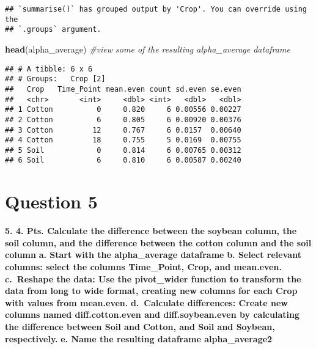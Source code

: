 \documentclass[
]{article}
\newenvironment{Shaded}{\begin{snugshade}}{\end{snugshade}}
\newcommand{\CommentTok}[1]{\textcolor[rgb]{0.56,0.35,0.01}{\textit{#1}}}
\newcommand{\FunctionTok}[1]{\textcolor[rgb]{0.13,0.29,0.53}{\textbf{#1}}}
\newcommand{\NormalTok}[1]{#1}
\begin{document}
\begin{verbatim}
## `summarise()` has grouped output by 'Crop'. You can override using the
## `.groups` argument.
\end{verbatim}

\begin{Shaded}
\begin{Highlighting}[]
\FunctionTok{head}\NormalTok{(alpha\_average) }\CommentTok{\#view some of the resulting alpha\_average dataframe}
\end{Highlighting}
\end{Shaded}

\begin{verbatim}
## # A tibble: 6 x 6
## # Groups:   Crop [2]
##   Crop   Time_Point mean.even count sd.even se.even
##   <chr>       <int>     <dbl> <int>   <dbl>   <dbl>
## 1 Cotton          0     0.820     6 0.00556 0.00227
## 2 Cotton          6     0.805     6 0.00920 0.00376
## 3 Cotton         12     0.767     6 0.0157  0.00640
## 4 Cotton         18     0.755     5 0.0169  0.00755
## 5 Soil            0     0.814     6 0.00765 0.00312
## 6 Soil            6     0.810     6 0.00587 0.00240
\end{verbatim}

\section{Question 5}\label{question-5}

\textbf{5. 4. Pts. Calculate the difference between the soybean column,
the soil column, and the difference between the cotton column and the
soil column} \textbf{a. Start with the alpha\_average dataframe}
\textbf{b. Select relevant columns: select the columns Time\_Point,
Crop, and mean.even.} \textbf{c.~Reshape the data: Use the pivot\_wider
function to transform the data from long to wide format, creating new
columns for each Crop with values from mean.even.} \textbf{d.~Calculate
differences: Create new columns named diff.cotton.even and
diff.soybean.even by calculating the difference between Soil and Cotton,
and Soil and Soybean, respectively.} \textbf{e. Name the resulting
dataframe alpha\_average2}
\end{document}
